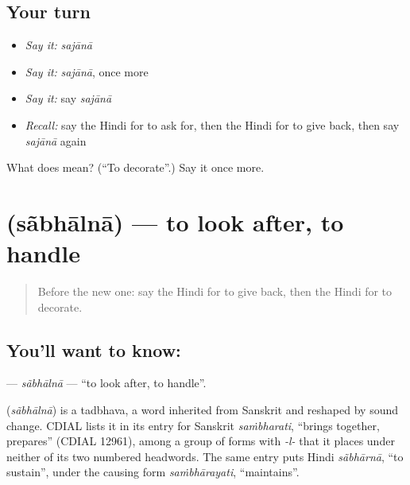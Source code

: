 \subsection*{Your turn}
\begin{itemize}
\raggedright
  \item \emph{Say it:} \emph{sajānā}
  \item \emph{Say it:} \emph{sajānā}, once more
  \item \emph{Say it:} say \emph{sajānā}
  \item \emph{Recall:} say the Hindi for to ask for, then the Hindi for to give back, then say \emph{sajānā} again
\end{itemize}

\begin{tcolorbox}[breakable,colback=teal!4,colframe=teal!35!black,title={Before you move on}]
What does  mean? (\textquotedblleft{}To decorate\textquotedblright{}.) Say it once more.
\end{tcolorbox}
\section[\texorpdfstring{\hi{सँभालना} (sãbhālnā)}{सँभालना (sãbhālnā)}]{ (sãbhālnā) — to look after, to handle}

\label{lesson:HI-C174-sabhalna}



\begin{quote}
Before the new one: say the Hindi for to give back, then the Hindi for to decorate.
\end{quote}

\subsection*{You'll want to know: }
\textbf{} — \emph{sãbhālnā} — \textquotedblleft{}to look after, to handle\textquotedblright{}.

\begin{cousinweb}
\textbf{} (\emph{sãbhālnā}) is a tadbhava, a word inherited from Sanskrit and reshaped by sound change. CDIAL lists it in its entry for Sanskrit \emph{saṁbharati}, \textquotedblleft{}brings together, prepares\textquotedblright{} (CDIAL 12961), among a group of forms with \emph{-l-} that it places under neither of its two numbered headwords. The same entry puts Hindi \emph{sãbhārnā}, \textquotedblleft{}to sustain\textquotedblright{}, under the causing form \emph{saṁbhārayati}, \textquotedblleft{}maintains\textquotedblright{}.
\end{cousinweb}

